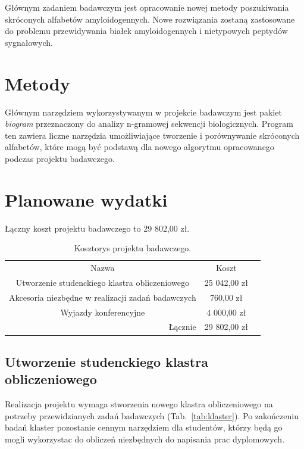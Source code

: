 \documentclass{article}
\begin{document}
Głównym zadaniem badawczym jest opracowanie nowej metody poszukiwania 
skróconych alfabetów amyloidogennych. Nowe rozwiązania zostaną zastosowane do 
problemu przewidywania białek amyloidogennych i nietypowych peptydów 
sygnałowych.

\section{Metody}

Głównym narzędziem wykorzystywanym w projekcie badawczym jest pakiet 
\textit{biogram} przeznaczony do analizy n-gramowej sekwencji biologicznych. 
Program ten zawiera liczne narzędzia umożliwiające tworzenie i porównywanie 
skróconych alfabetów, które mogą być podstawą dla nowego algorytmu opracowanego 
podczas projektu badawczego.


\section{Planowane wydatki}

Łączny koszt projektu badawczego to 29 802,00 zł.

\begin{table}[!htbp]
\centering
\caption*{Kosztorys projektu badawczego.}
\begin{tabular}{rrr}
\cline{1-2}
\multicolumn{1}{|c}{Nazwa}                                   & \multicolumn{1}{|c|}{Koszt}   &  \\ \cline{1-2}
\multicolumn{1}{|c}{Utworzenie studenckiego klastra obliczeniowego} & 
\multicolumn{1}{|c|}{25 042,00 zł} &  \\ \cline{1-2}
\multicolumn{1}{|c}{Akcesoria niezbędne w realizacji zadań badawczych}   & 
\multicolumn{1}{|c|}{760,00 zł} &  \\ \cline{1-2}
\multicolumn{1}{|c}{Wyjazdy konferencyjne}   & 
\multicolumn{1}{|c|}{4 000,00 zł} &  \\ \cline{1-2}
Łącznie    & 29 802,00 zł                    & 
\end{tabular}
\end{table}

\subsection{Utworzenie studenckiego klastra obliczeniowego}

Realizacja projektu wymaga stworzenia nowego klastra obliczeniowego na potrzeby 
przewidzianych zadań badawczych (Tab.~\ref{tab:klaster}). Po zakończeniu badań 
klaster pozostanie cennym narzędziem dla studentów, którzy będą go mogli 
wykorzystac do obliczeń niezbędnych do napisania prac dyplomowych.
\end{document}
